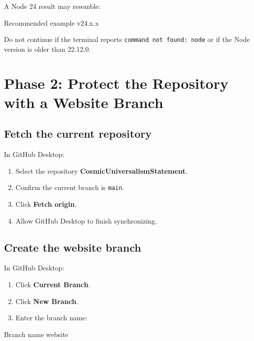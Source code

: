 \documentclass[11pt,letterpaper]{article}
\newcommand{\RepositoryName}{CosmicUniversalismStatement}
\newcommand{\menu}[1]{\textbf{\textsf{#1}}}
\newcommand{\branchname}[1]{\texttt{#1}}
\begin{document}
A Node 24 result may resemble:

\begin{codebox}{Recommended example}
v24.x.x
\end{codebox}

\begin{warningbox}
Do not continue if the terminal reports
\texttt{command not found: node} or if the Node version is older than
22.12.0.
\end{warningbox}

\section{Phase 2: Protect the Repository with a Website Branch}

\subsection{Fetch the current repository}

In GitHub Desktop:

\begin{enumerate}
    \item Select the repository \textbf{\RepositoryName}.
    \item Confirm the current branch is \branchname{main}.
    \item Click \menu{Fetch origin}.
    \item Allow GitHub Desktop to finish synchronizing.
\end{enumerate}

\subsection{Create the website branch}

In GitHub Desktop:

\begin{enumerate}
    \item Click \menu{Current Branch}.
    \item Click \menu{New Branch}.
    \item Enter the branch name:
\end{enumerate}

\begin{codebox}{Branch name}
website
\end{codebox}
\end{document}
